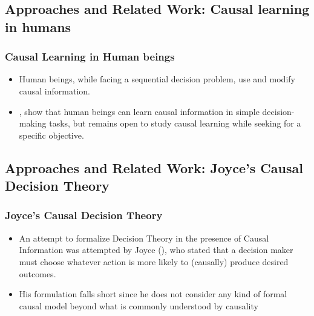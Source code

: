 \documentclass{beamer}
\theoremstyle{plain}
\begin{document}
\subsection{Approaches and Related Work: Causal learning in humans}
\begin{frame}
\frametitle{Causal Learning in Human beings}
\begin{itemize}
\item Human beings, while facing a sequential decision problem, use and modify causal information.
\item \cite{hagmayer2009decision}, \cite{hagmayer2013repeated} show that human beings can learn causal information in simple decision-making tasks, but remains open to study causal learning while seeking for a specific objective. 
\end{itemize}
\end{frame}
\subsection{Approaches and Related Work: Joyce's Causal Decision Theory}
\begin{frame}
\frametitle{Joyce's Causal Decision Theory}
\begin{itemize}
\item An attempt to formalize Decision Theory in the presence of Causal Information was attempted by Joyce (\cite{joyce1999foundations}), who stated that a decision maker must choose whatever action is more likely to (causally) produce desired outcomes.
\item  His formulation falls short since he does not consider any kind of formal causal model beyond what is commonly understood by causality
\end{itemize}
\end{frame}
\end{document}
